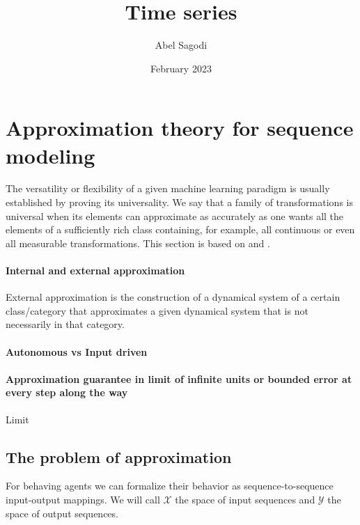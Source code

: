 \documentclass{article}
\title{Time series}
\author{Abel Sagodi}
\date{February 2023}
\theoremstyle{definition}
\theoremstyle{remark}
\begin{document}
\maketitle


\section{Approximation theory for sequence modeling}

The versatility or flexibility of a given machine learning paradigm is usually established by proving its universality. We say that a family of transformations is universal when its elements can approximate as accurately as one wants all the elements of a sufficiently rich class containing, for example, all continuous or even all measurable transformations.
This section is based on \citep{li2022approximation} and \citep{jiang2023brief}.



\paragraph{Internal and external approximation}
External approximation is the construction of a dynamical system of a certain class/category that approximates a given dynamical system that is not necessarily in that category.


\paragraph{Autonomous vs Input driven}

\paragraph{Approximation guarantee in limit of infinite units or bounded error at every step along the way}
Limit \citep{podlaski2024approximating}



\subsection{The problem of approximation} %
For behaving agents we can formalize their behavior as sequence-to-sequence input-output mappings.
We will call $\mathcal{X}$ the space of input sequences
and $\mathcal{Y}$ the space of output sequences.
\end{document}
